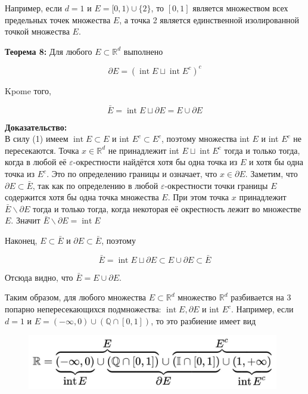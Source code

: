 \documentclass[a4paper,12pt]{article} %
\begin{document}
Например, если $d=1$ и $E=[0,1) \cup\{2\}$, то $[0,1]$ является множеством всех предельных точек множества $E$, а точка 2 является единственной изолированной точкой множества $E$.

\textbf{Теорема 8:} Для любого $E \subset \mathbb{R}^{d}$ выполнено

$$
\partial E=\left(\operatorname{int} E \sqcup \operatorname{int} E^{c}\right)^{c}
$$

Kpome того,

$$
\bar{E}=\operatorname{int} E \sqcup \partial E=E \cup \partial E
$$

\textbf{Доказательство:}\\
В силу (1) имеем $\operatorname{int} E \subset E$ и int $E^{c} \subset E^{c}$, поэтому множества int $E$ и int $E^{c}$ не пересекаются. Точка $x \in \mathbb{R}^{d}$ не принадлежит int $E \sqcup \operatorname{int} E^{c}$ тогда и только тогда, когда в любой её $\varepsilon$-окрестности найдётся хотя бы одна точка из $E$ и хотя бы одна точка из $E^{c}$. Это по определению границы и означает, что $x \in \partial E$. Заметим, что $\partial E \subset \bar{E}$, так как по определению в любой $\varepsilon$-окрестности точки границы $E$ содержится хотя бы одна точка множества $E$. При этом точка $x$ принадлежит $\bar{E} \backslash \partial E$ тогда и только тогда, когда некоторая её окрестность лежит во множестве $E$. Значит $\bar{E} \backslash \partial E=\operatorname{int} E$

Наконец, $E \subset \bar{E}$ и $\partial E \subset \bar{E}$, поэтому

$$
\bar{E}=\operatorname{int} E \sqcup \partial E \subset E \cup \partial E \subset \bar{E}
$$

Отсюда видно, что $\bar{E}=E \cup \partial E$.

Таким образом, для любого множества $E \subset \mathbb{R}^{d}$ множество $\mathbb{R}^{d}$ разбивается на 3 попарно непересекающихся подмножества: $\operatorname{int} E, \partial E$ и int $E^{c}$. Например, если $d=1$ и $E=(-\infty, 0) \cup(\mathbb{Q} \cap[0,1])$, то это разбиение имеет вид

\begin{figure}[H]
  \begin{center}
      \includegraphics[width=11cm]{2023_05_20_70c2606c431f82d3de98g-05.jpg}
  \end{center}
\end{figure}
\end{document}
